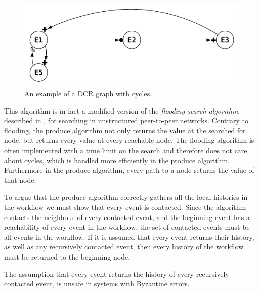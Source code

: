 	\begin{figure}[H]
		\centering
		\includegraphics[height=0.15\textheight]{4connect/images/dcr-graph-cycle.pdf}
		\caption{An example of a DCR graph with cycles.}
		\label{fig:connecting:dcr-graph-cycle}
	\end{figure}
		
	\newpar This algorithm is in fact a modified version of the \textit{flooding search algorithm}, described in \cite{Coulouris:2011:DSC:2029110:chapter6}, for searching in unstructured peer-to-peer networks. Contrary to flooding, the produce algorithm not only returns the value at the searched for node, but returns every value at every reachable node. The flooding algorithm is often implemented with a time limit on the search and therefore does not care about cycles, which is handled more efficiently in the produce algorithm. Furthermore in the produce algorithm, every path to a node returns the value of that node.
	
	\newpar To argue that the produce algorithm correctly gathers all the local histories in the workflow we must show that every event is contacted. Since the algorithm contacts the neighbour of every contacted event, and the beginning event has a reachability of every event in the workflow, the set of contacted events must be all events in the workflow. If it is assumed that every event returns their history, as well as any recursively contacted event, then every history of the workflow must be returned to the beginning node. 
	
	The assumption that every event returns the history of every recursively contacted event, is unsafe in systems with Byzantine errors.
	
